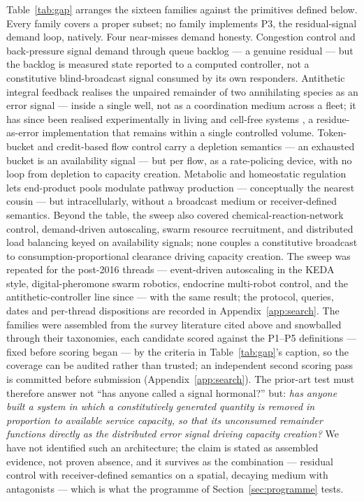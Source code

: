 \documentclass[twoside,twocolumn,usenatbib]{mnras}
\begin{document}
Table~\ref{tab:gap} arranges the sixteen families against the primitives
defined below. Every family covers a proper subset; no family implements
P3, the residual-signal demand loop, natively. Four near-misses
demand honesty. Congestion control and back-pressure
\citep{kelly1998} signal demand through queue backlog --- a genuine
residual --- but the backlog is measured state reported to a computed
controller, not a constitutive blind-broadcast signal consumed by its
own responders. Antithetic integral feedback \citep{briat2016} realises
the unpaired remainder of two annihilating species as an error signal
--- inside a single well, not as a coordination medium across a fleet;
it has since been realised experimentally in living and cell-free
systems \citep{aoki2019}, a residue-as-error implementation that
remains within a single controlled volume.
Token-bucket and credit-based flow control carry a depletion semantics
--- an exhausted bucket is an availability signal --- but per flow, as a
rate-policing device, with no loop from depletion to capacity creation.
Metabolic and homeostatic regulation lets end-product pools modulate
pathway production --- conceptually the nearest cousin --- but
intracellularly, without a broadcast medium or receiver-defined
semantics. Beyond the table, the sweep also covered
chemical-reaction-network control, demand-driven autoscaling, swarm
resource recruitment, and distributed load balancing keyed on
availability signals; none couples a constitutive broadcast to
consumption-proportional clearance driving capacity creation. The sweep
was repeated for the post-2016 threads --- event-driven autoscaling in
the KEDA style, digital-pheromone swarm robotics, endocrine
multi-robot control, and the antithetic-controller line since
\citet{briat2016} \citep{aoki2019, hunt2019} --- with the same result;
the protocol, queries, dates and per-thread dispositions are recorded
in Appendix~\ref{app:search}. The
families were assembled from the survey literature cited above and
snowballed through their taxonomies, each candidate scored against the
P1--P5 definitions --- fixed before scoring began --- by the criteria
in Table~\ref{tab:gap}'s caption, so
the coverage can be audited rather than trusted; an independent second
scoring pass is committed before submission (Appendix~\ref{app:search}).
The prior-art test must therefore answer not ``has anyone called a
signal hormonal?'' but: \emph{has anyone built a system in which a
constitutively generated quantity is removed in proportion to available
service capacity, so that its unconsumed remainder functions directly as
the distributed error signal driving capacity creation?} We have not
identified such an architecture; the claim is stated as assembled
evidence, not proven absence, and it survives as the combination ---
residual control with receiver-defined semantics on a spatial, decaying
medium with antagonists --- which is what the programme of
Section~\ref{sec:programme} tests.
\end{document}
